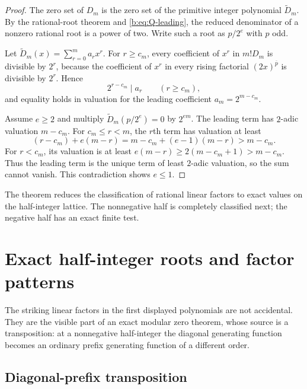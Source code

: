 \documentclass[11pt,a4paper,oneside,openany]{book}
\numberwithin{equation}{chapter}
\theoremstyle{definition}
\theoremstyle{remark}
\newcommand{\rising}[2]{#1^{\overline{#2}}}
\newcommand{\Diag}{D}
\newcommand{\Dprim}{\widetilde D}
\begin{document}
\begin{proof}
The zero set of $\Diag_m$ is the zero set of the primitive integer polynomial
$\Dprim_m$.  By the rational-root theorem and \eqref{b:eq:Q-leading}, the reduced
denominator of a nonzero rational root is a power of two.  Write such a root
as $p/2^e$ with $p$ odd.

Let $\Dprim_m(x)=\sum_{r=0}^{m}a_rx^r$.  For $r\ge c_m$, every coefficient of
$x^r$ in $m!\Diag_m$ is divisible by $2^r$, because the coefficient of
$x^r$ in every rising factorial $\rising{(2x)}p$ is divisible by $2^r$.
Hence
\begin{equation}
 2^{r-c_m}\mid a_r\qquad(r\ge c_m),
 \label{b:eq:coefficient-v2-bound}
\end{equation}
and equality holds in valuation for the leading coefficient
$a_m=2^{m-c_m}$.

Assume $e\ge2$ and multiply $\Dprim_m(p/2^e)=0$ by $2^{em}$.  The leading term
has $2$-adic valuation $m-c_m$.  For $c_m\le r<m$, the $r$th term has
valuation at least
\[
 (r-c_m)+e(m-r)
 =m-c_m+(e-1)(m-r)>m-c_m.
\]
For $r<c_m$, its valuation is at least
$e(m-r)\ge2(m-c_m+1)>m-c_m$.  Thus the leading term is the unique term of
least $2$-adic valuation, so the sum cannot vanish.  This contradiction shows
$e\le1$.
\end{proof}

The theorem reduces the classification of rational linear factors to exact
values on the half-integer lattice.  The nonnegative half is completely
classified next; the negative half has an exact finite test.
\chapter{Exact half-integer roots and factor patterns}\label{ch:roots}


The striking linear factors in the first displayed polynomials are not
accidental. They are the visible part of an exact modular zero theorem,
whose source is a transposition: at a nonnegative half-integer the diagonal
generating function becomes an ordinary prefix generating function of a
different order.

\section{Diagonal-prefix transposition}
\end{document}
